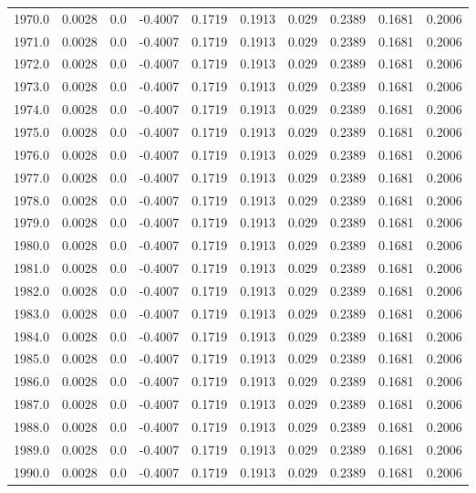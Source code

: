 \begin{longtable}{lrrrrrrrrr}
1970.0 & 0.0028 & 0.0 & -0.4007 & 0.1719 & 0.1913 & 0.029 & 0.2389 & 0.1681 & 0.2006 \\
1971.0 & 0.0028 & 0.0 & -0.4007 & 0.1719 & 0.1913 & 0.029 & 0.2389 & 0.1681 & 0.2006 \\
1972.0 & 0.0028 & 0.0 & -0.4007 & 0.1719 & 0.1913 & 0.029 & 0.2389 & 0.1681 & 0.2006 \\
1973.0 & 0.0028 & 0.0 & -0.4007 & 0.1719 & 0.1913 & 0.029 & 0.2389 & 0.1681 & 0.2006 \\
1974.0 & 0.0028 & 0.0 & -0.4007 & 0.1719 & 0.1913 & 0.029 & 0.2389 & 0.1681 & 0.2006 \\
1975.0 & 0.0028 & 0.0 & -0.4007 & 0.1719 & 0.1913 & 0.029 & 0.2389 & 0.1681 & 0.2006 \\
1976.0 & 0.0028 & 0.0 & -0.4007 & 0.1719 & 0.1913 & 0.029 & 0.2389 & 0.1681 & 0.2006 \\
1977.0 & 0.0028 & 0.0 & -0.4007 & 0.1719 & 0.1913 & 0.029 & 0.2389 & 0.1681 & 0.2006 \\
1978.0 & 0.0028 & 0.0 & -0.4007 & 0.1719 & 0.1913 & 0.029 & 0.2389 & 0.1681 & 0.2006 \\
1979.0 & 0.0028 & 0.0 & -0.4007 & 0.1719 & 0.1913 & 0.029 & 0.2389 & 0.1681 & 0.2006 \\
1980.0 & 0.0028 & 0.0 & -0.4007 & 0.1719 & 0.1913 & 0.029 & 0.2389 & 0.1681 & 0.2006 \\
1981.0 & 0.0028 & 0.0 & -0.4007 & 0.1719 & 0.1913 & 0.029 & 0.2389 & 0.1681 & 0.2006 \\
1982.0 & 0.0028 & 0.0 & -0.4007 & 0.1719 & 0.1913 & 0.029 & 0.2389 & 0.1681 & 0.2006 \\
1983.0 & 0.0028 & 0.0 & -0.4007 & 0.1719 & 0.1913 & 0.029 & 0.2389 & 0.1681 & 0.2006 \\
1984.0 & 0.0028 & 0.0 & -0.4007 & 0.1719 & 0.1913 & 0.029 & 0.2389 & 0.1681 & 0.2006 \\
1985.0 & 0.0028 & 0.0 & -0.4007 & 0.1719 & 0.1913 & 0.029 & 0.2389 & 0.1681 & 0.2006 \\
1986.0 & 0.0028 & 0.0 & -0.4007 & 0.1719 & 0.1913 & 0.029 & 0.2389 & 0.1681 & 0.2006 \\
1987.0 & 0.0028 & 0.0 & -0.4007 & 0.1719 & 0.1913 & 0.029 & 0.2389 & 0.1681 & 0.2006 \\
1988.0 & 0.0028 & 0.0 & -0.4007 & 0.1719 & 0.1913 & 0.029 & 0.2389 & 0.1681 & 0.2006 \\
1989.0 & 0.0028 & 0.0 & -0.4007 & 0.1719 & 0.1913 & 0.029 & 0.2389 & 0.1681 & 0.2006 \\
1990.0 & 0.0028 & 0.0 & -0.4007 & 0.1719 & 0.1913 & 0.029 & 0.2389 & 0.1681 & 0.2006 \\

\end{longtable}
